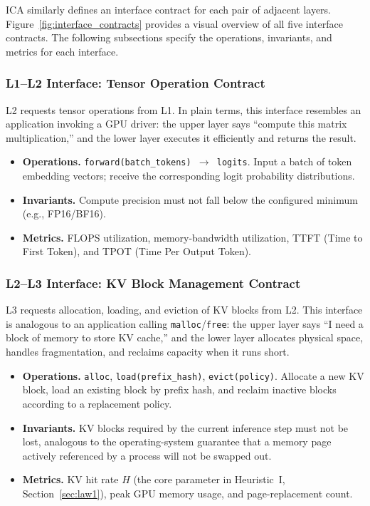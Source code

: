 ICA similarly defines an interface contract for each pair of adjacent layers. Figure~\ref{fig:interface_contracts} provides a visual overview of all five interface contracts. The following subsections specify the operations, invariants, and metrics for each interface.



\subsubsection{L1--L2 Interface: Tensor Operation Contract}

L2 requests tensor operations from L1. In plain terms, this interface resembles an application invoking a GPU driver: the upper layer says ``compute this matrix multiplication,'' and the lower layer executes it efficiently and returns the result.

\begin{itemize}[nosep]
\item \textbf{Operations.}
\texttt{forward(batch\_tokens) $\to$ logits}.
Input a batch of token embedding vectors; receive the corresponding logit probability distributions.
\item \textbf{Invariants.}
Compute precision must not fall below the configured minimum (e.g., FP16/BF16).
\item \textbf{Metrics.}
FLOPS utilization, memory-bandwidth utilization, TTFT (Time to First Token), and TPOT (Time Per Output Token).
\end{itemize}

\subsubsection{L2--L3 Interface: KV Block Management Contract}

L3 requests allocation, loading, and eviction of KV blocks from L2. This interface is analogous to an application calling \texttt{malloc}/\texttt{free}: the upper layer says ``I need a block of memory to store KV cache,'' and the lower layer allocates physical space, handles fragmentation, and reclaims capacity when it runs short.

\begin{itemize}[nosep]
\item \textbf{Operations.}
\texttt{alloc}, \texttt{load(prefix\_hash)}, \texttt{evict(policy)}.
Allocate a new KV block, load an existing block by prefix hash, and reclaim inactive blocks according to a replacement policy.
\item \textbf{Invariants.}
KV blocks required by the current inference step must not be lost, analogous to the operating-system guarantee that a memory page actively referenced by a process will not be swapped out.
\item \textbf{Metrics.}
KV hit rate $H$ (the core parameter in Heuristic~I, Section~\ref{sec:law1}), peak GPU memory usage, and page-replacement count.
\end{itemize}

